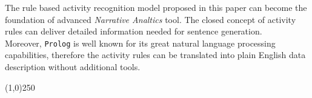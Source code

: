 \documentclass[10pt, a4paper, pdflatex, leqno, twoside, openright]{report}
\begin{document}
The rule based activity recognition model proposed in this paper can become the foundation of advanced \emph{Narrative Analtics} tool. The closed concept of activity rules can deliver detailed information needed for sentence generation.\\
Moreover, \texttt{Prolog} is well known for its great natural language processing capabilities, therefore the activity rules can be translated into plain English data description without additional tools.

\vfill
\begin{center}
\noindent \line(1,0){250}
\end{center}
\newpage
\thispagestyle{empty}%
\mbox{}

\cleardoublepage
{}
  {}
  
\cleardoublepage
{}
\end{document}
